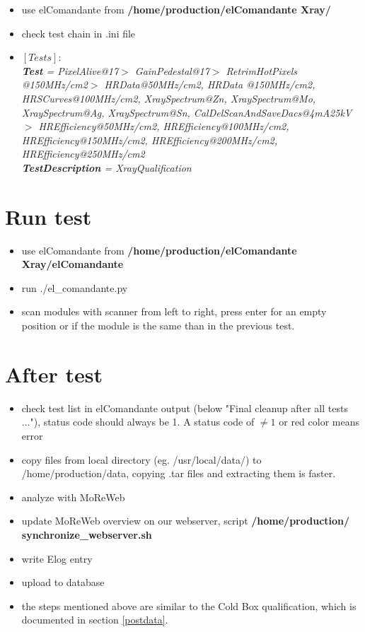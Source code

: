 \documentclass[fleqn,10pt]{SelfArx} %
\newcommand{\shellcmd}[1]{\\\indent\indent\texttt{\footnotesize\$ #1}\\}
\begin{document}
\begin{itemize}
\item use elComandante from \textbf{/home/production/elComandante{\color{Red} Xray}/}
\item check test chain in .ini file
\item $[Tests]$:\\
{\it {\bf Test} = PixelAlive@17$>$ GainPedestal@17$>$ RetrimHotPixels @150MHz/cm2$>$
HRData@50MHz/cm2, HRData @150MHz/cm2, HRSCurves@100MHz/cm2,
XraySpectrum@Zn, XraySpectrum@Mo, XraySpectrum@Ag, XraySpectrum@Sn,
CalDelScanAndSaveDacs@4mA25kV$>$ HREfficiency@50MHz/cm2,
HREfficiency@100MHz/cm2, HREfficiency@150MHz/cm2,
HREfficiency@200MHz/cm2, HREfficiency@250MHz/cm2\\
{\bf TestDescription} = XrayQualification}
\end{itemize}



\section{Run test}

\begin{itemize}
\item use elComandante from \textbf{/home/production/elComandante{\color{Red} Xray}/elComandante}
\item run ./el\_comandante.py
\item scan modules with scanner from left to right, press enter for an empty position or if the module is the same than in the previous test.
\end{itemize}


\section{After test}

\begin{itemize}
\item check test list in elComandante output (below "Final cleanup after all tests ..."), status code should always be 1. A status code of $\neq 1$ or red color means error
\item copy files from local directory (eg. /usr/local/data/) to /home/production/data, copying .tar files and extracting them is faster.
\item analyze with MoReWeb
\item update MoReWeb overview on our webserver, script \textbf{/home/production/ synchronize\_webserver.sh}
\item write Elog entry
\item upload to database
\item the steps mentioned above are similar to the Cold Box qualification, which is documented in section \ref{postdata}.
\end{itemize}
\end{document}

